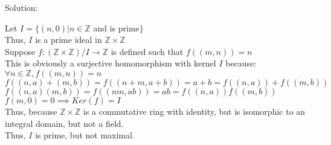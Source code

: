 \documentclass{article} %
\begin{document}
Solution: 
\begin{addmargin}[1em]{0em}
Let $I = \{(n,0)|n \in \mathbb{Z}$ and is prime$\}$
\\Thus, $I$ is a prime ideal in $\mathbb{Z} \times \mathbb{Z}$
\\Suppose $f: (\mathbb{Z} \times \mathbb{Z})/I \rightarrow \mathbb{Z}$ is defined such that $f((m,n)) = n$
\\This is obviously a surjective homomorphism with kernel $I$ because:
\\ $\forall n \in \mathbb{Z}, f((m,n)) = n$
\\ $f((n,a) + (m,b)) = f((n + m,a+b)) = a+b = f((n,a)) + f((m,b))$
\\ $f((n,a)(m,b)) = f((nm,ab)) = ab = f((n,a))f((m,b))$
\\ $f(m,0) = 0 \implies Ker(f) = I$
\\Thus, because $\mathbb{Z} \times \mathbb{Z}$ is a commutative ring with identity, but is isomorphic to an integral domain, but not a field.
\\Thus, $I$ is prime, but not maximal.
\end{addmargin}

\newpage
\end{document}
